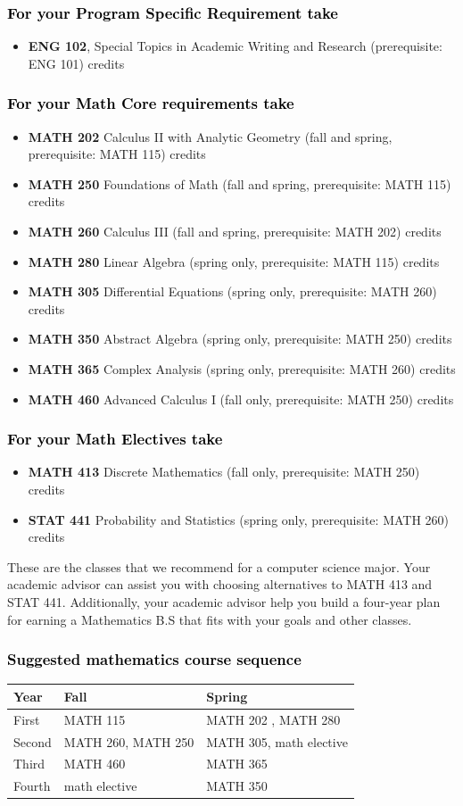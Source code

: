 \documentclass[11pt]{article}
\newcommand{\calconeshort}{MATH 115}
\newcommand{\calctwo}{\textbf{MATH 202} Calculus II with Analytic Geometry (fall and spring, prerequisite: MATH 115) \dotfill 5 credits }
\newcommand{\calctwoshort}{MATH 202}
\newcommand{\foundations}{\textbf{MATH 250} Foundations of Math (fall and spring, prerequisite: MATH 115)  \dotfill 3 credits}
\newcommand{\foundationsshort}{MATH 250}
\newcommand{\calcthree}{\textbf{MATH 260} Calculus III  (fall and spring, prerequisite: MATH 202) \dotfill 5 credits}
\newcommand{\calcthreeshort}{MATH 260}
\newcommand{\linear}{\textbf{MATH 280} Linear Algebra (spring only, prerequisite: MATH 115) \dotfill 3 credits}
\newcommand{\linearshort}{MATH 280}
\newcommand{\discrete}{\textbf{MATH 413} Discrete Mathematics  (fall only, prerequisite: MATH 250)\dotfill 3 credits}
\newcommand{\discreteshort}{MATH 413}
\newcommand{\statistics}{\textbf{STAT 441} Probability and Statistics (spring only, prerequisite: MATH 260)  \dotfill  3 credits}
\newcommand{\statisticsshort}{STAT 441}
\newcommand{\diffeq}{\textbf{MATH 305}	Differential Equations (spring only, prerequisite: MATH 260) \dotfill 	3 credits}
\newcommand{\diffeqshort}{MATH 305}
\newcommand{\abstractalgebra}{\textbf{MATH 350}	Abstract Algebra (spring only, prerequisite: MATH 250) \dotfill 	3 credits}
\newcommand{\abstractalgebrashort}{MATH 350}
\newcommand{\complex}{\textbf{MATH 365}	Complex Analysis (spring only,  prerequisite: MATH 260) \dotfill 3 credits}
\newcommand{\complexshort}{MATH 365}
\newcommand{\advancedcalc}{\textbf{MATH 460}	Advanced Calculus I  (fall only,   prerequisite: MATH 250) \dotfill 3 credits}
\newcommand{\advancedcalcshort}{MATH 460}
\newcommand{\mathBS}{
     \begin{center}
         \begin{tabular}[h]{| l | l | l|} 
            \hline
            \textbf{Year}           & \textbf{Fall}         &  \textbf{Spring}  \\ \hline 
            First & \calconeshort{}  & \calctwoshort{} , \linearshort  \\  \hline
            Second &  \calcthreeshort{}, \foundationsshort & \diffeqshort, math elective \\ \hline
            Third & \advancedcalcshort              &  \complexshort{}\\ \hline
            Fourth & math elective &  \abstractalgebrashort  \\ \hline
         \end{tabular}
\end{center}}
\begin{document}
\subsubsection*{\textcolor{black}{For your Program Specific Requirement take}}

\begin{itemize}
   \item \textbf{ENG 102}, Special Topics in Academic Writing and Research (prerequisite: ENG 101)   credits
\end{itemize}

	

\subsubsection*{\textcolor{black}{For your Math Core requirements take}}

\begin{itemize}
   \item \calctwo
   \item \foundations
      \item \calcthree
   \item \linear
   \item \diffeq
  \item \abstractalgebra
  \item \complex
  \item \advancedcalc
\end{itemize}



\subsubsection*{\textcolor{black}{For your  Math Electives take}}
\begin{itemize}
\item \discrete
\item \statistics
\end{itemize}
\vspace{0.1in}
These are the classes that we recommend for a computer science major.
Your academic advisor can assist you with choosing alternatives 
to \discreteshort{} and \statisticsshort{}. Additionally, your 
academic advisor help you build a four-year plan for earning a 
Mathematics B.S that fits with your goals and other classes.



\subsubsection*{\textcolor{black}{Suggested mathematics course sequence}}
   \mathBS
\end{document}
